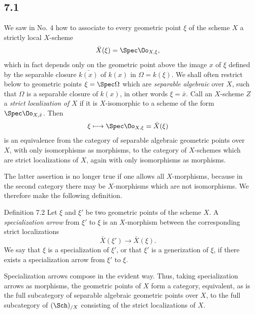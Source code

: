 \subsection*{7.1}
We saw in No. 4 how to associate to every geometric point \(\xi\) of the scheme \(X\) a strictly local \(X\)-scheme
\[
\bar X(\xi)=\Spec\Oo_{X,\xi},
\]
which in fact depends only on the geometric point above the image \(x\) of \(\xi\) defined by the separable closure \(\bar{k(x)}\) of \(k(x)\) in \(\Omega=k(\xi)\). We shall often restrict below to geometric points \(\xi=\Spec\Omega\) which are \emph{separable algebraic} over \(X\), \ie such that \(\Omega\) is a separable closure of \(k(x)\), in other words \(\xi=\bar x\). Call an \(X\)-scheme \(Z\) a \emph{strict localization of \(X\)} if it is \(X\)-isomorphic to a scheme of the form \(\Spec\Oo_{X,\bar x}\). Then
\[
\xi\longmapsto \Spec\Oo_{X,\xi}=\bar X(\xi)
\]
is an equivalence from the category of separable algebraic geometric points over \(X\), with only isomorphisms as morphisms, to the category of \(X\)-schemes which are strict localizations of \(X\), again with only isomorphisms as morphisms.

The latter assertion is no longer true if one allows all \(X\)-morphisms, because in the second category there may be \(X\)-morphisms which are not isomorphisms. We therefore make the following definition.

\begin{statement}{Definition 7.2}
Let \(\xi\) and \(\xi'\) be two geometric points of the scheme \(X\). A \emph{specialization arrow} from \(\xi'\) to \(\xi\) is an \(X\)-morphism between the corresponding strict localizations
\[
\bar X(\xi')\longrightarrow \bar X(\xi).
\]
We say that \(\xi\) is a specialization of \(\xi'\), or that \(\xi'\) is a generization of \(\xi\), if there exists a specialization arrow from \(\xi'\) to \(\xi\).
\end{statement}

Specialization arrows compose in the evident way. Thus, taking specialization arrows as morphisms, the geometric points of \(X\) form a category, equivalent, as is the full subcategory of separable algebraic geometric points over \(X\), to the full subcategory of \((\Sch)_{/X}\) consisting of the strict localizations of \(X\).

